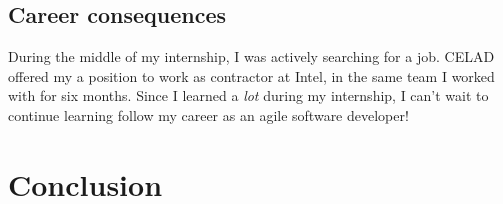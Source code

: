 \subsection{Career consequences}
During the middle of my internship, I was actively searching for a job. CELAD offered my a position to work
as contractor at Intel, in the same team I worked with for six months.
Since I learned a \emph{lot} during my internship, I can't wait to continue learning follow my career
as an agile software developer!

\section{Conclusion}
